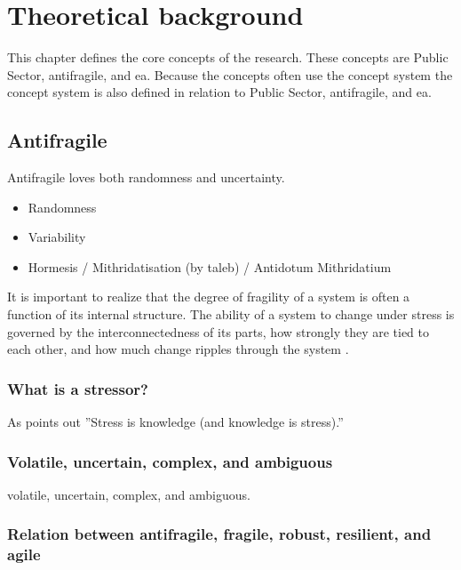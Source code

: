 \chapter{Theoretical background}
\label{ch:theoreticalbackground}
This chapter defines the core concepts of the research. These concepts are Public Sector, \gls{antifragile}, and \acrlong{ea}. Because the concepts often use the concept system the concept system is also defined in relation to Public Sector, \gls{antifragile}, and \acrshort{ea}.



\section{Antifragile}
\label{sec:tbantifragile}

Antifragile loves both randomness and uncertainty.

\begin{itemize}
	\item{Randomness}
	\item{Variability}
	\item{Hormesis / Mithridatisation (by taleb) / Antidotum Mithridatium}
\end{itemize}

It is important to realize that the degree of \gls{fragility} of a system is often a function of its internal structure. The ability of a system to change under stress is governed by the interconnectedness of its parts, how strongly they are tied to each other, and how much change ripples through the system \parencite[p. 886]{OReilly2019}.\\



\subsection{What is a stressor?}
\label{sub:stressor}
As \textcite[p. 54]{Taleb2012} points out ''Stress is knowledge (and knowledge is stress).''

\subsection{Volatile, uncertain, complex, and ambiguous}
\label{seb:tbvuca}

\Gls{volatile}, \gls{uncertain}, \gls{complex}, and \gls{ambiguous}.

\subsection{Relation between antifragile, fragile, robust, resilient, and agile}
\label{sub:tbrelatedtoantifragile}

